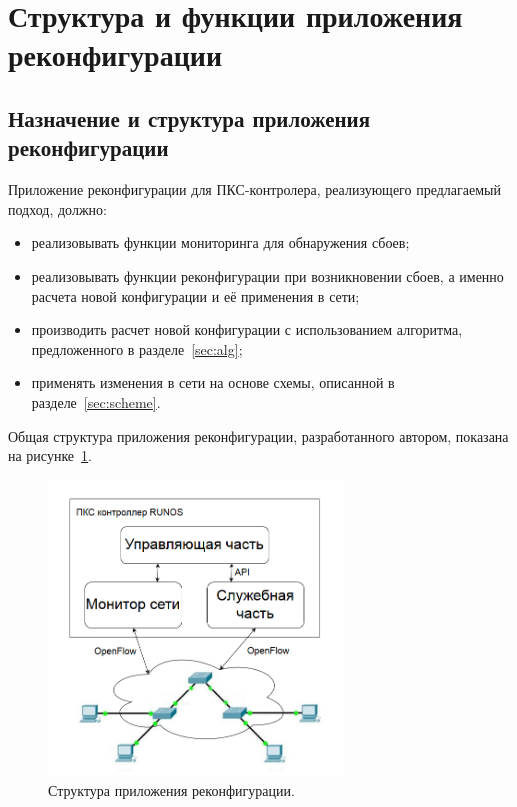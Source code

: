 \documentclass[12pt, a4paper]{article}
\begin{document}
\section{Структура и функции приложения реконфигурации}
\subsection{Назначение и структура приложения реконфигурации}

Приложение реконфигурации для ПКС-контролера, реализующего предлагаемый подход, должно:
\begin{itemize}
	\item реализовывать функции мониторинга для обнаружения сбоев;
	\item реализовывать функции реконфигурации при возникновении сбоев, а именно расчета новой конфигурации и её применения в сети;
	\item производить расчет новой конфигурации с использованием алгоритма, предложенного в разделе~\ref{sec:alg};
	\item применять изменения в сети на основе схемы, описанной в разделе~\ref{sec:scheme}.
\end{itemize}

Общая структура приложения реконфигурации, разработанного автором, показана на рисунке~\ref{pic:netcontrol}.

\begin{figure}[h!]
	\centering
	\includegraphics[width=0.70\textwidth]{img/netcontrol.png}
	\caption{Структура приложения реконфигурации.}
	\label{pic:netcontrol}
\end{figure}

\FloatBarrier
\end{document}

